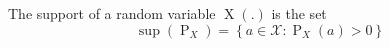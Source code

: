 The support of a random variable $\operatorname{X}(.)$ is the set
$$\operatorname{sup}(\operatorname{P}_X) = \left\{ a \in \mathcal{X} : \operatorname{P}_X(a) >0 \right\}$$
